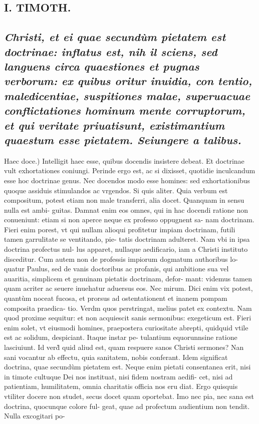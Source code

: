 \documentclass{article}
\begin{document}
\begin{pages}
\section*{I. TIMOTH. }
\marginpar{[ p.74 ]}
{}
\subsection*{\textit{Christi, et ei quae secundùm pietatem est doctrinae: inflatus est, nih il sciens, sed languens circa quaestiones et pugnas verborum: ex quibus oritur inuidia, con tentio, maledicentiae, suspitiones malae, superuacuae conflictationes hominum mente corruptorum, et qui veritate priuatisunt, existimantium quaestum esse pietatem. Seiungere a talibus. }}\pstart Haec doce.) Intelligit haec esse, quibus docendis insistere debeat. Et doctrinae vult exhortationes coniungi. Perinde ergo est, ac si dixisset, quotidie inculcandum esse hoc doctrinae genus. Nec docendos modo esse homines: sed exhortationibus quoque assiduis stimulandos ac vrgendos.  \pend\pstart Si quis aliter. Quia verbum est compositum, potest etiam non male transferri, alia docet. Quanquam in sensu nulla est ambi- guitas. Damnat enim eos omnes, qui in hac docendi ratione non conueniunt: etiam si non aperce neque ex professo oppugnent sa- nam doctrinam. Fieri enim porest, vt qui nullam alioqui profitetur impiam doctrinam, futili tamen garrulitate se ventitando, pie- tatis doctrinam adulteret. Nam vbi in ipsa doctrina profectus nul- lus apparet, nullaque aedificario, iam a Christi instituto disceditur. Cum autem non de professis impiorum dogmatum authoribus lo- quatur Paulus, sed de vanis doctoribus ac profanis, qui ambitione sua vel auaritia, simplicem et genuinam pietatis doctrinam, defor- mant: videmus tamen quam acriter ac seuere inuehatur aduersus eos. Nec mirum. Dici enim vix potest, quantùm noceat fucosa, et prorsus ad ostentationent et inanem pompam composita praedica- tio. Verdm quos perstringat, melius patet ex contextu. Nam quod proxime sequitur: et non acquiescit sanis sermonibus: exegeticum est. Fieri enim solet, vt eiusmodi homines, praepostera curiositate abrepti, quidquid vtile est ac solidum, despiciant. Itaque instar pe- tulantium equorunnsine ratione lasciuiunt. Id verd̀ quid aliud est, quam respuere sanos Christi sermones? Nan sani vocantur ab effectu, quia sanitatem, nobis conferant. Idem significat doctrina, quae secundùm pietatem est. Neque enim pietati consentanea erit, nisi in timote cultuque Dei nos instituat, nisi fidem nostram aedifi- cet, nisi ad patientiam, humilitatem, omnia charitatis officia nos eru diat. Ergo quisquis vtiliter docere non studet, secus docet quam oportebat. Imo nec pia, nec sana est doctrina, quocunque colore ful- geat, quae ad profectum audientium non tendit. Nulla excogitari po-  \pend

\end{pages}
\end{document}
